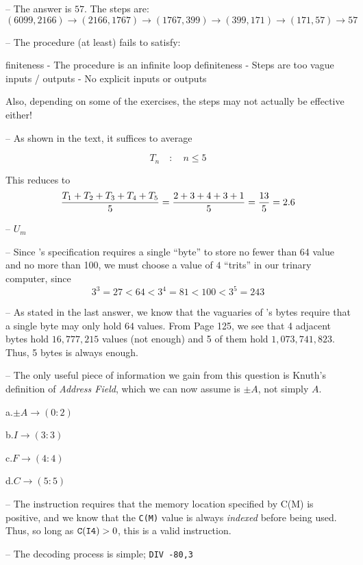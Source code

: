 \endalgo

 -- The answer is $57$. The steps are:
$$
(6099, 2166) \to
(2166, 1767) \to
(1767, 399) \to
(399, 171) \to
(171, 57) \to
57
$$

 -- The procedure (at least) fails to satisfy:

\itemitem{*} finiteness - The procedure is an infinite loop
\itemitem{*} definiteness - Steps are too vague
\itemitem{*} inputs / outputs - No explicit inputs or outputs

Also, depending on some of the exercises, the steps may not actually
be effective either!

 -- As shown in the text, it suffices to average

$$T_n \quad : \quad n \le 5$$

This reduces to $$ {T_1 + T_2 + T_3 + T_4 + T_5 \over 5} = {2 + 3 + 4
+ 3 + 1 \over 5} = {13 \over 5} = 2.6$$

 -- $U_m$ \TODO



 -- Since \MIX's specification requires a single ``byte''
to store no fewer than 64 value and no more than 100, we must choose a
value of $4$ ``trits'' in our trinary computer, since
$$3^3=27 < 64 < 3^4=81 < 100 < 3^5=243$$

 -- As stated in the last answer, we know that the vaguaries
of \MIX's bytes require that a single byte may only hold $64$
values. From Page 125, we see that 4 adjacent bytes hold $16,777,215$
values (not enough) and 5 of them hold $1,073,741,823$. Thus, 5 bytes
is always enough.

 -- The only useful piece of information we gain from this
question is Knuth's definition of {\it Address Field}, which we can
now assume is $\pm A$, not simply $A$.
\item{a.}$\pm A \longrightarrow (0:2)$
\item{b.}$I \longrightarrow (3:3)$
\item{c.}$F \longrightarrow (4:4)$
\item{d.}$C \longrightarrow (5:5)$

 -- The instruction requires that the memory location
specified by {C(M)} is positive, and we know that the {\tt C(M)} value
is always {\it indexed} before being used. Thus, so long as
${\tt C(I4)}>0$, this is a valid instruction.

 -- The decoding process is simple; {\tt DIV -80,3}


